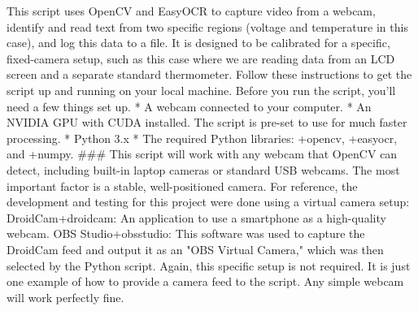 \markdownRendererDocumentBegin
This script uses OpenCV and EasyOCR to capture video from a webcam, identify and read text from two specific regions (voltage and temperature in this case), and log this data to a file.\markdownRendererInterblockSeparator
{}It is designed to be calibrated for a specific, fixed-camera setup, such as this case where we are reading data from an LCD screen and a separate standard thermometer.\markdownRendererInterblockSeparator
{}\markdownRendererSectionBegin
\markdownRendererSectionBegin
{}\markdownRendererInterblockSeparator
{}Follow these instructions to get the script up and running on your local machine.\markdownRendererInterblockSeparator
{}\markdownRendererSectionBegin
{}\markdownRendererInterblockSeparator
{}Before you run the script, you'll need a few things set up.\markdownRendererInterblockSeparator
{} * A webcam connected to your computer. *  An NVIDIA GPU with CUDA installed. The script is pre-set to use  for much faster processing.\markdownRendererInterblockSeparator
{} * Python 3.x * The required Python libraries: +{}{}{opencv}, +{}{}{easyocr}, and +{}{}{numpy}.\markdownRendererInterblockSeparator
{}###  This script will work with any webcam that OpenCV can detect, including built-in laptop cameras or standard USB webcams. The most important factor is a stable, well-positioned camera.\markdownRendererInterblockSeparator
{}For reference, the development and testing for this project were done using a virtual camera setup:\markdownRendererInterblockSeparator
{}\markdownRendererUlBegin
\markdownRendererUlItem DroidCam+{}{}{droidcam}: An application to use a smartphone as a high-quality webcam.\markdownRendererUlItemEnd 
\markdownRendererUlItem OBS Studio+{}{}{obsstudio}: This software was used to capture the DroidCam feed and output it as an "OBS Virtual Camera," which was then selected by the Python script.\markdownRendererUlItemEnd 
\markdownRendererUlEnd \markdownRendererInterblockSeparator
{}Again, this specific setup is not required. It is just one example of how to provide a camera feed to the script. Any simple webcam will work perfectly fine.\markdownRendererInterblockSeparator
